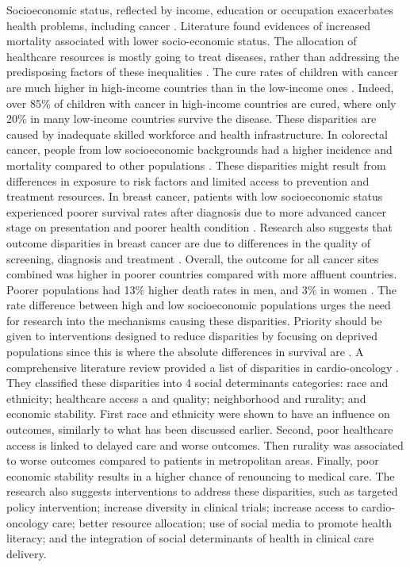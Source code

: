 Socioeconomic status, reflected by income, education or occupation exacerbates
health problems, including cancer \cite{adler_socioeconomic_2002}. Literature
found evidences of increased mortality associated with lower socio-economic
status. The allocation of healthcare resources is mostly going to treat
diseases, rather than addressing the predisposing factors of these inequalities
\cite{mcginnis_actual_1993}.
The cure rates of children with cancer are much higher in high-income countries
than in the low-income ones \cite{lubega_global_2021}. Indeed, over 85\% of
children with cancer in high-income countries are cured, where only 20\% in many
low-income countries survive the disease. These disparities are caused by
inadequate skilled workforce and health infrastructure.
In colorectal cancer,  people from low socioeconomic backgrounds had a higher
incidence and mortality compared to other populations
\cite{carethers_causes_2020}. These disparities might result from differences in
exposure to risk factors and limited access to prevention and treatment
resources.
In breast cancer, patients with low socioeconomic status experienced
poorer survival rates after diagnosis due to more advanced cancer stage
on presentation and poorer health condition \cite{silber_disparities_2018}.
Research also suggests that outcome disparities in breast cancer are due to
differences in the quality of screening, diagnosis and treatment
\cite{grabinski_disparities_2022}.
Overall, the outcome for all cancer sites combined was higher in poorer
countries compared with more affluent countries. Poorer populations had
13\% higher death rates in men, and 3\% in women \cite{ward_cancer_2004}.
The rate difference between high and low socioeconomic populations urges the
need for research into the mechanisms causing these disparities. Priority
should be given to interventions designed to reduce disparities by focusing
on deprived populations since this is where the absolute differences in
survival are \cite{kish_racial_2014}.
A comprehensive literature review provided a list of disparities in
cardio-oncology \cite{ahmad_disparities_2022}. They classified these disparities
into 4 social determinants categories: race and ethnicity; healthcare access a
and quality; neighborhood and rurality; and economic stability. First race and
ethnicity were shown to have an influence on outcomes, similarly to what has
been discussed earlier. Second, poor healthcare access is linked to delayed
care and worse outcomes. Then rurality was associated to worse outcomes
compared to patients in metropolitan areas. Finally, poor economic stability
results in a higher chance of renouncing to medical care. The research also
suggests interventions to address these disparities, such as targeted policy
intervention; increase diversity in clinical trials; increase access to
cardio-oncology care; better resource allocation; use of social media to
promote health literacy; and the integration of social determinants of health
in clinical care delivery.

